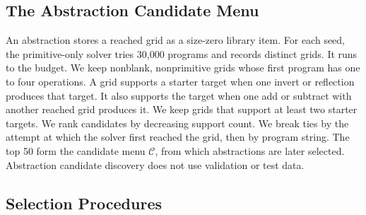 \documentclass[10pt]{article}
\begin{document}
\subsection{The Abstraction Candidate Menu}

An abstraction stores a reached grid as a size-zero library item. For each
seed, the primitive-only solver tries 30,000 programs and records distinct
grids. It runs to the budget. We keep nonblank, nonprimitive grids whose first
program has one to four operations. A grid supports a starter target when one
invert or reflection produces that target. It also supports the target when
one add or subtract with another reached grid produces it. We keep grids that
support at least two starter targets. We rank candidates by decreasing support
count. We break ties by the attempt at which the solver first reached the grid,
then by program string. The top 50 form the candidate menu $\mathcal C$, from which
abstractions are later selected. Abstraction candidate discovery does not use validation or test data.

\subsection{Selection Procedures}
\end{document}
